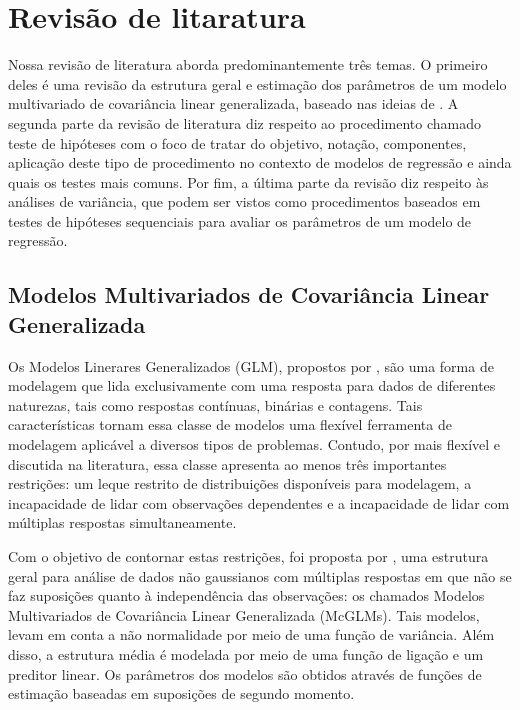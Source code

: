 \chapter{Revisão de litaratura}

\label{cap:literatura}

Nossa revisão de literatura aborda predominantemente três temas. O primeiro deles é uma revisão da estrutura geral e estimação dos parâmetros de um modelo multivariado de covariância linear generalizada, baseado nas ideias de \citet{Bonat16}. A segunda parte da revisão de literatura diz respeito ao procedimento chamado teste de hipóteses com o foco de tratar do objetivo, notação, componentes, aplicação deste tipo de procedimento no contexto de modelos de regressão e ainda quais os testes mais comuns. Por fim, a última parte da revisão diz respeito às análises de variância, que podem ser vistos como procedimentos baseados em testes de hipóteses sequenciais para avaliar os parâmetros de um modelo de regressão.

\section{Modelos Multivariados de Covariância Linear Generalizada}

Os Modelos Linerares Generalizados (GLM), propostos por \citet{Nelder72}, são uma forma de modelagem que lida exclusivamente com uma resposta para dados de diferentes naturezas, tais como respostas contínuas, binárias e contagens. Tais características tornam essa classe de modelos uma flexível ferramenta de modelagem aplicável a diversos tipos de problemas. Contudo, por mais flexível e discutida na literatura, essa classe apresenta ao menos três importantes restrições: um leque restrito de distribuições disponíveis para modelagem, a incapacidade de lidar com observações dependentes e a incapacidade de lidar com múltiplas respostas simultaneamente. 

Com o objetivo de contornar estas restrições, foi proposta por \citet{Bonat16}, uma estrutura geral para análise de dados não gaussianos com múltiplas respostas em que não se faz suposições quanto à independência das observações: os chamados Modelos Multivariados de Covariância Linear Generalizada (McGLMs). Tais modelos, levam em conta a não normalidade por meio de uma função de variância. Além disso, a estrutura média é modelada por meio de uma função de ligação e um preditor linear. Os parâmetros dos modelos são obtidos através de funções de estimação baseadas em suposições de segundo momento.

